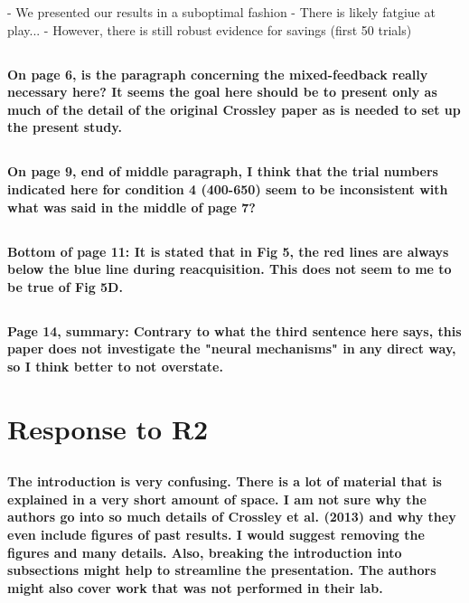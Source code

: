\documentclass[10pt,a4paper]{article} \usepackage{amsmath} \usepackage{parskip}
\begin{document}
- We presented our results in a suboptimal fashion
- There is likely fatgiue at play...
- However, there is still robust evidence for savings (first 50 trials)

\subsection{} \textbf{
  On page 6, is the paragraph concerning the mixed-feedback really necessary here?
  It seems the goal here should be to present only as much of the detail of the
  original Crossley paper as is needed to set up the present study.
}

\subsection{} \textbf{
  On page 9, end of middle paragraph, I think that the trial numbers indicated
  here for condition 4 (400-650) seem to be inconsistent with what was said in the
  middle of page 7?
}

\subsection{} \textbf{
  Bottom of page 11: It is stated that in Fig 5, the red lines are always below
  the blue line during reacquisition. This does not seem to me to be true of Fig
  5D.
}

\subsection{} \textbf{
  Page 14, summary: Contrary to what the third sentence here says, this paper does
  not investigate the "neural mechanisms" in any direct way, so I think better to
  not overstate.
}


\section{Response to R2}

\subsection{} \textbf{
  The introduction is very confusing. There is a lot of material that is explained
  in a very short amount of space. I am not sure why the authors go into so much
  details of Crossley et al. (2013) and why they even include figures of past
  results. I would suggest removing the figures and many details. Also, breaking
  the introduction into subsections might help to streamline the presentation. The
  authors might also cover work that was not performed in their lab.
}
\end{document}
